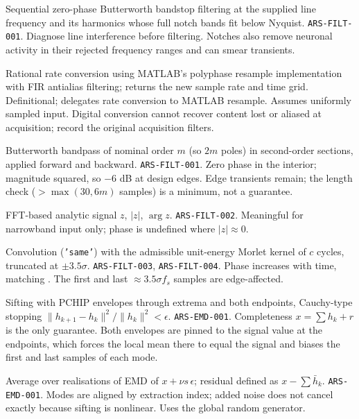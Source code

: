 {Sequential zero-phase Butterworth bandstop filtering at the supplied line frequency and its harmonics whose full notch bands fit below Nyquist.}
{\texttt{ARS-FILT-001}.}
{Diagnose line interference before filtering. Notches also remove neuronal activity in their rejected frequency ranges and can smear transients.}

{Rational rate conversion using MATLAB's polyphase resample implementation with FIR antialias filtering; returns the new sample rate and time grid.}
{Definitional; delegates rate conversion to MATLAB resample.}
{Assumes uniformly sampled input. Digital conversion cannot recover content lost or aliased at acquisition; record the original acquisition filters.}

{Butterworth bandpass of nominal order $m$ (so $2m$ poles) in second-order sections, applied forward and backward.}
{\texttt{ARS-FILT-001}.}
{Zero phase in the interior; magnitude squared, so $-6$ dB at design edges. Edge transients remain; the length check ($>\max(30,6m)$ samples) is a minimum, not a guarantee.}

{FFT-based analytic signal $z$, $|z|$, $\arg z$.}
{\texttt{ARS-FILT-002}.}
{Meaningful for narrowband input only; phase is undefined where $|z|\approx0$.}

{Convolution (\texttt{'same'}) with the admissible unit-energy Morlet kernel of $c$ cycles, truncated at $\pm3.5\sigma$.}
{\texttt{ARS-FILT-003}, \texttt{ARS-FILT-004}.}
{Phase increases with time, matching . The first and last $\approx3.5\sigma f_s$ samples are edge-affected.}

{Sifting with PCHIP envelopes through extrema and both endpoints, Cauchy-type stopping $\|h_{k+1}-h_k\|^2/\|h_k\|^2<\epsilon$.}
{\texttt{ARS-EMD-001}.}
{Completeness $x=\sum h_k+r$ is the only guarantee. Both envelopes are pinned to the signal value at the endpoints, which forces the local mean there to equal the signal and biases the first and last samples of each mode.}

{Average over realisations of EMD of $x+\nu s\,\epsilon$; residual defined as $x-\sum\bar h_k$.}
{\texttt{ARS-EMD-001}.}
{Modes are aligned by extraction index; added noise does not cancel exactly because sifting is nonlinear. Uses the global random generator.}

